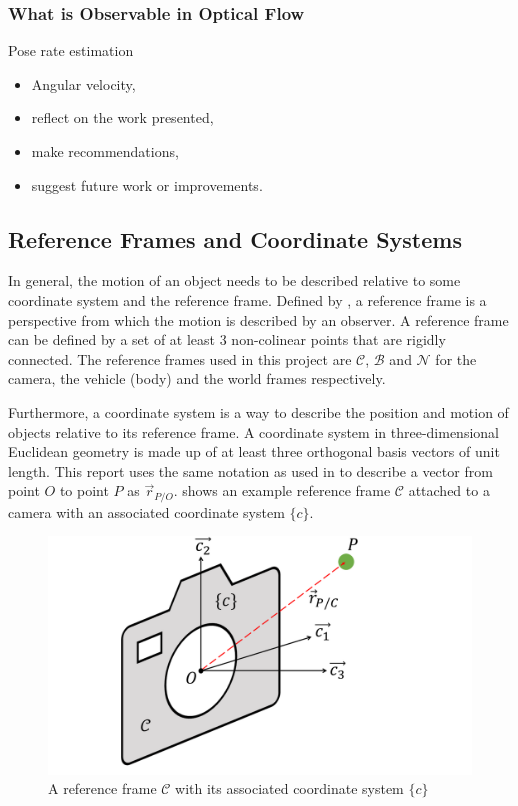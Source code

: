 \documentclass{UoNMCHA}
\numberwithin{equation}{section}
\begin{document}
\subsubsection{What is Observable in Optical Flow}
Pose rate estimation

\begin{itemize}
	\item Angular velocity,
	\item reflect on the work presented, 
	\item make recommendations,
	\item suggest future work or improvements.
\end{itemize}
\subsection{Reference Frames and Coordinate Systems}
In general, the motion of an object needs to be described relative to some coordinate system and the reference frame. Defined by \cite{3900Notes}, a reference frame is a perspective from which the motion is described by an observer. A reference frame can be defined by a set of at least 3 non-colinear points that are rigidly connected. The reference frames used in this project are $\mathcal{C}$, $\mathcal{B}$ and $\mathcal{N}$ for the camera, the vehicle (body) and the world frames respectively.

Furthermore, a coordinate system is a way to describe the position and motion of objects relative to its reference frame. A coordinate system in three-dimensional Euclidean geometry is made up of at least three orthogonal basis vectors of unit length. This report uses the same notation as used in \cite{3900Notes} to describe a vector from point $O$ to point $P$ as $\vec{r}_{P/O}$.  shows an example reference frame $\mathcal{C}$ attached to a camera with an associated coordinate system $\{c\}$.

\begin{figure}[ht]
    \begin{center}
        \includegraphics[width=.6\linewidth]{Figures/ReferenceFrame}
        \caption{A reference frame $\mathcal{C}$ with its associated coordinate system $\{c\}$}
        \label{fig:ReferenceFrame}
    \end{center}
\end{figure}
\end{document}
